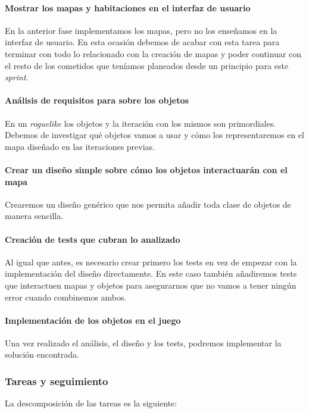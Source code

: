 \paragraph{Mostrar los mapas y habitaciones en el interfaz de usuario} En la anterior fase implementamos los mapas, pero no los enseñamos en la interfaz de usuario. En esta ocasión debemos de acabar con esta tarea para terminar con todo lo relacionado con la creación de mapas y poder continuar con el resto de los cometidos que teníamos planeados desde un principio para este \textit{sprint}.

\paragraph{Análisis de requisitos para sobre los objetos} En un \textit{roguelike} los objetos y la iteración con los mismos son primordiales. Debemos de investigar qué objetos vamos a usar y cómo los representaremos en el mapa diseñado en las iteraciones previas.

\paragraph{Crear un diseño simple sobre cómo los objetos interactuarán con el mapa} Crearemos un diseño genérico que nos permita añadir toda clase de objetos de manera sencilla.

\paragraph{Creación de tests que cubran lo analizado} Al igual que antes, es necesario crear primero los tests en vez de empezar con la implementación del diseño directamente. En este caso también añadiremos tests que interactuen mapas y objetos para asegurarnos que no vamos a tener ningún error cuando combinemos ambos.

\paragraph{Implementación de los objetos en el juego} Una vez realizado el análisis, el diseño y los tests, podremos implementar la solución encontrada.

\subsubsection{Tareas y seguimiento}

La descomposición de las tareas es la siguiente:

